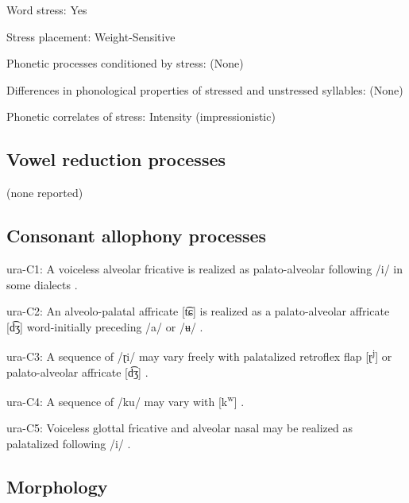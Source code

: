 {\begin{appendixdesc}
\item[Word stress:] Yes

\item[Stress placement:] Weight-Sensitive

\item[Phonetic processes conditioned by stress:] (None)

\item[Differences in phonological properties of stressed and unstressed syllables:] (None)

\item[Phonetic correlates of stress:] Intensity (impressionistic)
\end{appendixdesc}
\subsection*{Vowel reduction processes}

(none reported)
\subsection*{Consonant allophony processes}
\begin{appendixdesc}

\item[ura-C1:] A voiceless alveolar fricative is realized as palato-alveolar following /i/ in some dialects \citep[38]{Olawsky2006}.

\item[ura-C2:] An alveolo-palatal affricate [t͡ɕ] is realized as a palato-alveolar affricate [d͡ʒ] word-initially preceding /a/ or /ʉ/ \citep[39]{Olawsky2006}.

\item[ura-C3:] A sequence of /ɽi/ may vary freely with palatalized retroflex flap [ɽ\textsuperscript{j}] or palato-alveolar affricate [d͡ʒ] \citep[71]{Olawsky2006}.

\item[ura-C4:] A sequence of /ku/ may vary with [k\textsuperscript{w}] \citep[37]{Olawsky2006}.

\item[ura-C5:] Voiceless glottal fricative and alveolar nasal may be realized as palatalized following /i/ \citep[47]{Olawsky2006}.
\end{appendixdesc}
\subsection*{Morphology}

}
